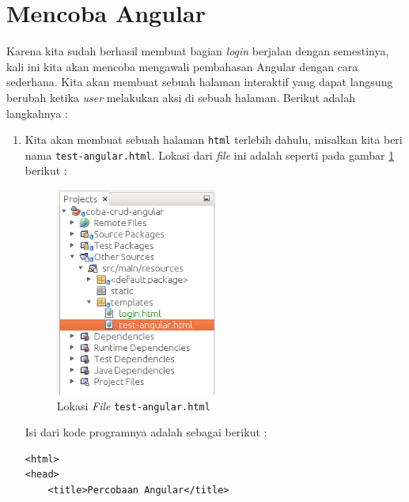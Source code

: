 \section{Mencoba Angular}

Karena kita sudah berhasil membuat bagian \textit{login} berjalan dengan semestinya, kali ini kita akan mencoba mengawali pembahasan Angular dengan cara sederhana. Kita akan membuat sebuah halaman interaktif yang dapat langsung berubah ketika \textit{user} melakukan aksi di sebuah halaman. Berikut adalah langkahnya :

\begin{enumerate}
	\item Kita akan membuat sebuah halaman \texttt{html} terlebih dahulu, misalkan kita beri nama \texttt{test-angular.html}. Lokasi dari \textit{file} ini adalah seperti pada gambar \ref{fig:lokasi-test-angular} berikut :
	
	\begin{figure}[H]
		\centering
		\includegraphics[width=0.5\textwidth]{./resources/026-lokasi-test-angular}
		\caption{Lokasi \textit{File} \texttt{test-angular.html}}
		\label{fig:lokasi-test-angular}
	\end{figure}
	
	Isi dari kode programnya adalah sebagai berikut :
	
	\begin{lstlisting}
<html>
<head>
	<title>Percobaan Angular</title>


\end{lstlisting}
\end{enumerate}
